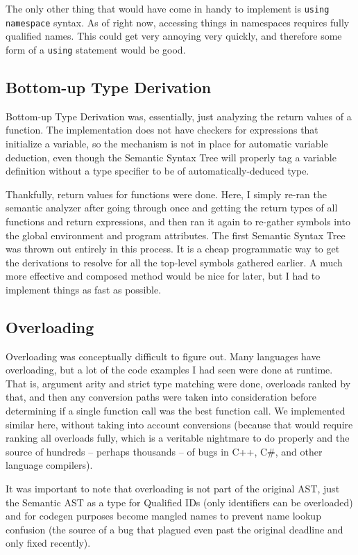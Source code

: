 The only other thing that would have come in handy to implement is \lstinline|using namespace| syntax. As of right now, accessing things in namespaces requires fully qualified names. This could get very annoying very quickly, and therefore some form of a \lstinline|using| statement would be good.

\subsection{Bottom-up Type Derivation}
Bottom-up Type Derivation was, essentially, just analyzing the return values of a function. The implementation does not have checkers for expressions that initialize a variable, so the mechanism is not in place for automatic variable deduction, even though the Semantic Syntax Tree will properly tag a variable definition without a type specifier to be of automatically-deduced type.

Thankfully, return values for functions were done. Here, I simply re-ran the semantic analyzer after going through once and getting the return types of all functions and return expressions, and then ran it again to re-gather symbols into the global environment and program attributes. The first Semantic Syntax Tree was thrown out entirely in this process. It is a cheap programmatic way to get the derivations to resolve for all the top-level symbols gathered earlier. A much more effective and composed method would be nice for later, but I had to implement things as fast as possible.

\subsection{Overloading}
Overloading was conceptually difficult to figure out. Many languages have overloading, but a lot of the code examples I had seen were done at runtime. That is, argument arity and strict type matching were done, overloads ranked by that, and then any conversion paths were taken into consideration before determining if a single function call was the best function call. We implemented similar here, without taking into account conversions (because that would require ranking all overloads fully, which is a veritable nightmare to do properly and the source of hundreds -- perhaps thousands -- of bugs in C++, C\#, and other language compilers).

It was important to note that overloading is not part of the original AST, just the Semantic AST as a type for Qualified IDs (only identifiers can be overloaded) and for codegen purposes become mangled names to prevent name lookup confusion (the source of a bug that plagued even past the original deadline and only fixed recently).

